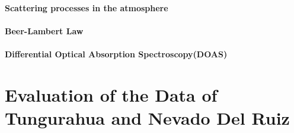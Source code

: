 \documentclass  [
  paper    = a4,
  BCOR     = 10mm,
  twoside,
  fontsize = 12pt,
  fleqn,
  toc      = bibnumbered,
  toc      = listofnumbered,
  numbers  = noendperiod,
  headings = normal,
  listof   = leveldown,
  version  = 3.03
]                                       {scrreprt}
\begin{document}
	\subsection{Scattering processes in the atmosphere}
	\subsection{Beer-Lambert Law}
	\subsection{Differential Optical Absorption Spectroscopy(DOAS)\label{DOAS}}
	
	\part{Evaluation of the Data of Tungurahua and Nevado Del Ruiz}
	
	
\end{document}
